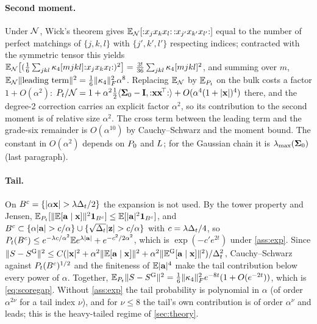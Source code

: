 \paragraph{Second moment.}
Under $\mathcal{N}$, Wick's theorem gives
$\mathbb{E}_{\mathcal{N}}[{:}x_jx_kx_l{:}\,{:}x_{j'}x_{k'}x_{l'}{:}]$ equal to the number of perfect
matchings of $\{j,k,l\}$ with $\{j',k',l'\}$ respecting indices; contracted with the
symmetric tensor this yields
$\mathbb{E}_{\mathcal{N}}\bigl[(\tfrac16\sum_{jkl}\kappa_4[mjkl]{:}x_jx_kx_l{:})^2\bigr]
=\tfrac{3!}{36}\sum_{jkl}\kappa_4[mjkl]^2$, and summing over $m$,
$\mathbb{E}_{\mathcal{N}}\lVert\text{leading term}\rVert^2=\tfrac16\lVert \kappa_4 \rVert_{F}^2\alpha^8$. Replacing
$\mathbb{E}_{\mathcal{N}}$ by $\mathbb{E}_{P_t}$ on the bulk costs a factor $1+O(\alpha^2)$:
$P_t/\mathcal{N}=1+\alpha^2\tfrac12\langle\mathbf{\Sigma}_0-\mathbf{I},{:}\mathbf{x}\mathbf{x}^{\!\top}{:}\rangle+O(\alpha^4(1+|\mathbf{x}|)^4)$
there, and the degree-2 correction carries an explicit factor $\alpha^2$, so its contribution to the second moment is of relative size $\alpha^2$. The cross term between the
leading term and the grade-six remainder is $O(\alpha^{10})$ by Cauchy--Schwarz and the
moment bound. The constant in $O(\alpha^2)$ depends on $P_0$ and $L$; for the
Gaussian chain it is $\lambda_{\max}(\mathbf{\Sigma}_0)$ (last paragraph).

\paragraph{Tail.}
On $B^c=\{|\alpha\vx|>\lambda\Dt/2\}$ the expansion is not used. By the tower property
and Jensen, $\mathbb{E}_{P_t}[\lVert\mathbb{E}[\mathbf{a}\mid\mathbf{x}]\rVert^2\mathbf 1_{B^c}]\le\mathbb{E}[|\mathbf{a}|^2\mathbf 1_{B^c}]$,
and $B^c\subset\{\alpha|\va|>c/\alpha\}\cup\{\sqrt{\Dt}|\vz|>c/\alpha\}$ with
$c=\lambda\Delta_t/4$, so $P_t(B^c)\le e^{-\lambda c/\alpha^2}\mathbb{E} e^{\lambda|\mathbf{a}|}+e^{-c^2/2\alpha^2}$,
which is $\exp(-c'e^{2t})$ under \cref{ass:exp}. Since
$\lVert S-S^{\mathrm{G}}\rVert^2\le C(|\mathbf{x}|^2+\alpha^2\lVert\mathbb{E}[\mathbf{a}\mid\mathbf{x}]\rVert^2+\alpha^2\lVert\mathbb{E}^{\mathrm G}[\mathbf{a}\mid\mathbf{x}]\rVert^2)/\Delta_t^2$,
Cauchy--Schwarz against $P_t(B^c)^{1/2}$ and the finiteness of $\mathbb{E}|\mathbf{a}|^4$ make the tail
contribution below every power of $\alpha$. Together,
$\mathbb{E}_{P_t}\lVert S-S^{\mathrm{G}}\rVert^2=\tfrac16\lVert \kappa_4 \rVert_{F}^2e^{-8t}(1+O(e^{-2t}))$,
which is \cref{eq:scoregap}. Without \cref{ass:exp} the tail probability is polynomial
in $\alpha$ (of order $\alpha^{2\nu}$ for a tail index $\nu$), and for $\nu\le8$ the
tail's own contribution is of order $\alpha^\nu$ and leads; this is the heavy-tailed
regime of \cref{sec:theory}.

